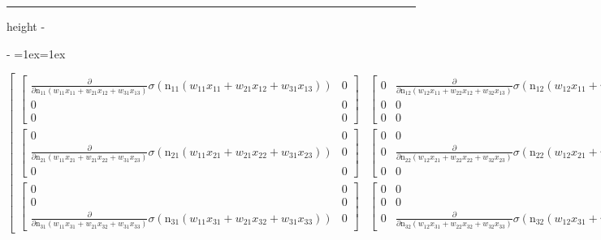 \documentclass[letterpaper,10pt,english]{sphinxmanual}
\makeatletter
\newenvironment{nbsphinxfancyoutput}{%
    \let\sphinxincludegraphics\nbsphinxincludegraphics
    \nbsphinx@image@maxheight\textheight
    \advance\nbsphinx@image@maxheight -2\fboxsep   %
    \advance\nbsphinx@image@maxheight -2\fboxrule  %
    \advance\nbsphinx@image@maxheight -\baselineskip
\def\nbsphinxfcolorbox{\spx@fcolorbox{nbsphinx-code-border}{white}}%
\def\FrameCommand{\nbsphinxfcolorbox\nbsphinxfancyaddprompt\@empty}%
\def\FirstFrameCommand{\nbsphinxfcolorbox\nbsphinxfancyaddprompt\sphinxVerbatim@Continues}%
\def\MidFrameCommand{\nbsphinxfcolorbox\sphinxVerbatim@Continued\sphinxVerbatim@Continues}%
\def\LastFrameCommand{\nbsphinxfcolorbox\sphinxVerbatim@Continued\@empty}%
\MakeFramed{\advance\hsize-\width\@totalleftmargin\z@\linewidth\hsize\@setminipage}%
\lineskip=1ex\lineskiplimit=1ex\raggedright%
}{\par\unskip\@minipagefalse\endMakeFramed}
\def\nbsphinxfancyaddprompt{\ifvoid\nbsphinxpromptbox\else
    \kern\fboxrule\kern\fboxsep
    \copy\nbsphinxpromptbox
    \kern-\ht\nbsphinxpromptbox\kern-\dp\nbsphinxpromptbox
    \kern-\fboxsep\kern-\fboxrule\nointerlineskip
    \fi}
\newlength\nbsphinxcodecellspacing
\newcommand*{\nbsphinxincludegraphics}[2][]{%
    \gdef\spx@includegraphics@options{#1}%
    \setbox\spx@image@box\hbox{\texttt{[image: \#2]}}%
    \in@false
    \ifdim \wd\spx@image@box>\linewidth
      \g@addto@macro\spx@includegraphics@options{,width=\linewidth}%
      \in@true
    \fi
    \ifdim \ht\spx@image@box>\nbsphinx@image@maxheight
      \g@addto@macro\spx@includegraphics@options{,height=\nbsphinx@image@maxheight}%
      \in@true
    \fi
    \ifin@
      \g@addto@macro\spx@includegraphics@options{,keepaspectratio}%
    \fi
    \setbox\spx@image@box\box\voidb@x %
    \expandafter\includegraphics\expandafter[\spx@includegraphics@options]{#2}%
}%
\makeatother
\begin{document}
\hrule height -\fboxrule\relax
\vspace{\nbsphinxcodecellspacing}

\savebox\nbsphinxpromptbox[0pt][r]{\color{nbsphinxout}\Verb|\strut{[56]:}\,|}

\begin{nbsphinxfancyoutput}
$\displaystyle \left[\begin{matrix}\left[\begin{matrix}\frac{\partial}{\partial \operatorname{n_{11}}{\left(w_{11} x_{11} + w_{21} x_{12} + w_{31} x_{13} \right)}} \sigma{\left(\operatorname{n_{11}}{\left(w_{11} x_{11} + w_{21} x_{12} + w_{31} x_{13} \right)} \right)} & 0\\0 & 0\\0 & 0\end{matrix}\right] & \left[\begin{matrix}0 & \frac{\partial}{\partial \operatorname{n_{12}}{\left(w_{12} x_{11} + w_{22} x_{12} + w_{32} x_{13} \right)}} \sigma{\left(\operatorname{n_{12}}{\left(w_{12} x_{11} + w_{22} x_{12} + w_{32} x_{13} \right)} \right)}\\0 & 0\\0 & 0\end{matrix}\right]\\\left[\begin{matrix}0 & 0\\\frac{\partial}{\partial \operatorname{n_{21}}{\left(w_{11} x_{21} + w_{21} x_{22} + w_{31} x_{23} \right)}} \sigma{\left(\operatorname{n_{21}}{\left(w_{11} x_{21} + w_{21} x_{22} + w_{31} x_{23} \right)} \right)} & 0\\0 & 0\end{matrix}\right] & \left[\begin{matrix}0 & 0\\0 & \frac{\partial}{\partial \operatorname{n_{22}}{\left(w_{12} x_{21} + w_{22} x_{22} + w_{32} x_{23} \right)}} \sigma{\left(\operatorname{n_{22}}{\left(w_{12} x_{21} + w_{22} x_{22} + w_{32} x_{23} \right)} \right)}\\0 & 0\end{matrix}\right]\\\left[\begin{matrix}0 & 0\\0 & 0\\\frac{\partial}{\partial \operatorname{n_{31}}{\left(w_{11} x_{31} + w_{21} x_{32} + w_{31} x_{33} \right)}} \sigma{\left(\operatorname{n_{31}}{\left(w_{11} x_{31} + w_{21} x_{32} + w_{31} x_{33} \right)} \right)} & 0\end{matrix}\right] & \left[\begin{matrix}0 & 0\\0 & 0\\0 & \frac{\partial}{\partial \operatorname{n_{32}}{\left(w_{12} x_{31} + w_{22} x_{32} + w_{32} x_{33} \right)}} \sigma{\left(\operatorname{n_{32}}{\left(w_{12} x_{31} + w_{22} x_{32} + w_{32} x_{33} \right)} \right)}\end{matrix}\right]\end{matrix}\right]$
\end{nbsphinxfancyoutput}
\end{document}
